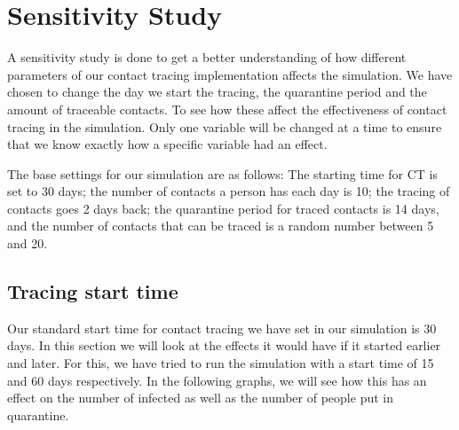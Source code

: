 \section{Sensitivity Study}
A sensitivity study is done to get a better understanding of how different parameters of our contact tracing implementation affects the simulation. We have chosen to change the day we start the tracing, the quarantine period and the amount of traceable contacts. To see how these affect the effectiveness of contact tracing in the simulation. Only one variable will be changed at a time to ensure that we know exactly how a specific variable had an effect.

The base settings for our simulation are as follows: The starting time for CT is set to 30 days; the number of contacts a person has each day is 10; the tracing of contacts goes 2 days back; the quarantine period for traced contacts is 14 days, and the number of contacts that can be traced is a random number between 5 and 20. 

\subsection{Tracing start time}
Our standard start time for contact tracing we have set in our simulation is 30 days. In this section we will look at the effects it would have if it started earlier and later. For this, we have tried to run the simulation with a start time of 15 and 60 days respectively. In the following graphs, we will see how this has an effect on the number of infected as well as the number of people put in quarantine.


